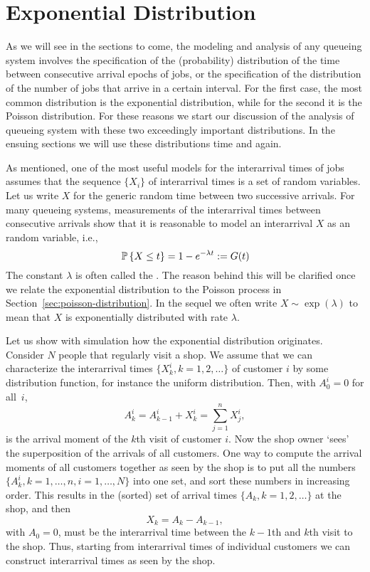 \section{Exponential Distribution}
\label{sec:expon-distr}
As we will see in the sections to come, the modeling and analysis of
any queueing system involves the specification of the (probability)
distribution of the time between consecutive arrival epochs of jobs,
or the specification of the distribution of the number of jobs that
arrive in a certain interval.  For the first case, the most common
distribution is the exponential distribution, while for the second it
is the Poisson distribution.  For these reasons we start our
discussion of the analysis of queueing system with these two
exceedingly important distributions. In the ensuing sections we will
use these distributions time and again.

As mentioned, one of the most useful models for the interarrival
times of jobs assumes that the sequence $\{X_i\}$ of interarrival
times is a set of   random variables.  Let us write $X$ for the generic
random time between two successive arrivals. For many queueing
systems, measurements of the interarrival times between consecutive
arrivals show that it is reasonable to model an interarrival $X$ as
an  random variable, i.e.,
\begin{equation*}
  \P{X \leq t} = 1- e^{-\lambda t} := G(t)
\end{equation*}
The constant $\lambda$ is often called the . The reason
behind this will be clarified once we relate the exponential
distribution to the Poisson process in
Section~\ref{sec:poisson-distribution}.  In the sequel we often write
$X\sim \exp(\lambda)$ to mean that $X$ is exponentially distributed
with rate $\lambda$.


Let us show with simulation how the exponential distribution
originates. Consider $N$ people that regularly visit a shop. We assume
that we can characterize the interarrival times
$\{X_k^i, k=1,2, \ldots\}$ of customer $i$ by some distribution
function, for instance the uniform distribution. Then, with
$A_{0}^i=0$ for all~$i$,
\begin{equation*}
A_k^i = A_{k-1}^i + X_k^i = \sum_{j=1}^n X_j^i,
\end{equation*}
is the arrival moment of the $k$th visit of customer $i$.  Now the
shop owner `sees' the superposition of the arrivals of all
customers. One way to compute the arrival moments of all customers
together as seen by the shop is to put all the numbers
$\{A_k^i, k=1,\ldots,n, i=1,\ldots,N\}$ into one set, and sort these
numbers in increasing order. This results in the (sorted) set of
arrival times $\{A_k, k=1,2,\ldots\}$ at the shop, and then
\begin{equation*}
X_k = A_k - A_{k-1},
\end{equation*}
with $A_0=0$, must be the interarrival time between the $k-1$th and
$k$th visit to the shop.  Thus, starting from interarrival times of
individual customers we can construct interarrival times as seen by
the shop.

